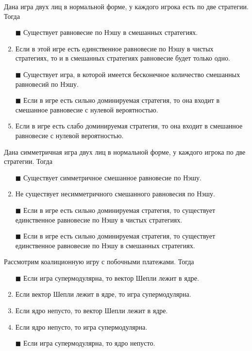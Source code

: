 \task
Дана игра двух лиц в нормальной форме, у каждого игрока есть по две стратегии. Тогда
\begin{enumerate}[label=$\square$]	%
	\item[$\blacksquare$] Существует равновесие по Нэшу в смешанных стратегиях.
	\item Если в этой игре есть единственное равновесие по Нэшу в чистых стратегиях, то и в смешанных стратегиях равновесие будет только одно.
	\item[$\blacksquare$] Существует игра, в которой имеется бесконечное количество смешанных равновесий по Нэшу.
	\item[$\blacksquare$] Если в игре есть сильно доминируемая стратегия, то она входит в смешанное равновесие с нулевой вероятностью.
	\item Если в игре есть слабо доминируемая стратегия, то она входит в смешанное равновесие с нулевой вероятностью.
\end{enumerate}

\task
Дана симметричная игра двух лиц в нормальной форме, у каждого игрока по две стратегии. Тогда

\begin{enumerate}[label=$\square$]	%
	\item[$\blacksquare$] Существует симметричное смешанное равновесие по Нэшу.
	\item Не существует несимметричного смешанного равновесия по Нэшу.	
	\item[$\blacksquare$] Если в игре есть сильно доминируемая стратегия, то существует единственное равновесие по Нэшу в чистых стратегиях.
	\item[$\blacksquare$] Если в игре есть сильно доминируемая стратегия, то существует единственное равновесие по Нэшу в смешанных стратегиях.
\end{enumerate}

\task
Рассмотрим коалиционную игру с побочными платежами. Тогда

\begin{enumerate}[label=$\square$]	%
	\item[$\blacksquare$] Если игра супермодулярна, то вектор Шепли лежит в ядре.
	\item Если вектор Шепли лежит в ядре, то игра супермодулярна.
	\item Если ядро непусто, то вектор Шепли лежит в ядре.
	\item Если ядро непусто, то игра супермодулярна.
	\item[$\blacksquare$] Если игра супермодулярна, то ядро непусто.
\end{enumerate}

